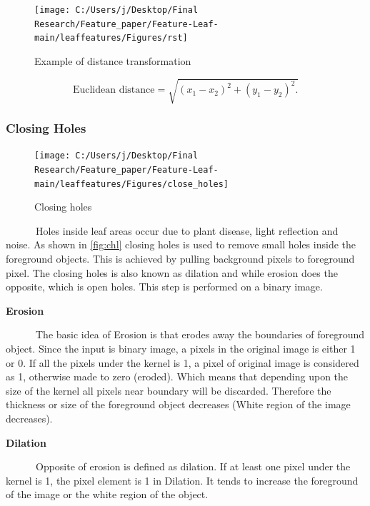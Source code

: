\documentclass{article}
\begin{document}
\begin{figure}[!ht]

{\centering \texttt{[image: C:/Users/j/Desktop/Final Research/Feature\_paper/Feature-Leaf-main/leaffeatures/Figures/rst]} 

}

\caption{\label{fig:rstex}Example of distance transformation}\label{fig:unnamed-chunk-8}
\end{figure}

\begin{equation}
    \text{Euclidean distance} = \sqrt{(x_1 - x_2)^2 + (y_1 - y_2)^2.}
    \label{eu}
\end{equation}

\hypertarget{closing-holes}{%
\subsubsection{Closing Holes}\label{closing-holes}}

\begin{figure}[!ht]

{\centering \texttt{[image: C:/Users/j/Desktop/Final Research/Feature\_paper/Feature-Leaf-main/leaffeatures/Figures/close\_holes]} 

}

\caption{\label{fig:chl}Closing holes}\label{fig:unnamed-chunk-9}
\end{figure}

~~~~~~Holes inside leaf areas occur due to plant disease, light
reflection and noise. As shown in \ref{fig:chl} closing holes is used to
remove small holes inside the foreground objects. This is achieved by
pulling background pixels to foreground pixel. The closing holes is also
known as dilation and while erosion does the opposite, which is open
holes. This step is performed on a binary image.

\textbf{Erosion}

~~~~~~The basic idea of Erosion is that erodes away the boundaries of
foreground object. Since the input is binary image, a pixels in the
original image is either 1 or 0. If all the pixels under the kernel is
1, a pixel of original image is considered as 1, otherwise made to zero
(eroded). Which means that depending upon the size of the kernel all
pixels near boundary will be discarded. Therefore the thickness or size
of the foreground object decreases (White region of the image
decreases).

\textbf{Dilation}

~~~~~~Opposite of erosion is defined as dilation. If at least one pixel
under the kernel is 1, the pixel element is 1 in Dilation. It tends to
increase the foreground of the image or the white region of the object.
\end{document}
